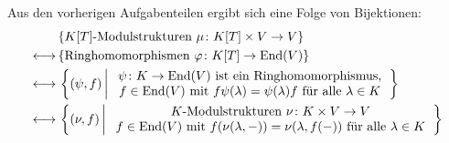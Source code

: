 \documentclass[a4paper, 10pt, numbers=noenddot]{scrartcl}
\begin{document}
Aus den vorherigen Aufgabenteilen ergibt sich eine Folge von Bijektionen:
\begin{align*}
  &\,
  \{
    \text{$K[T]$-Modulstrukturen $\mu \colon K[T] \times V \to V$}
  \}
  \\
  \longleftrightarrow&\,
  \{
    \text{Ringhomomorphismen $\varphi \colon K[T] \to \End(V)$}
  \}
  \\
  \longleftrightarrow&\,
  \left\{
    (\psi, f)
  \,
  \middle|
  \,
    \begin{tabular}{c}
      $\psi \colon K \to \End(V)$ ist ein Ringhomomorphismus, \\
      $f \in \End(V)$ mit $f \psi(\lambda) = \psi(\lambda) f$ für alle $\lambda \in K$
    \end{tabular}
  \right\}
  \\
  \longleftrightarrow&\,
  \left\{
    (\nu, f)
  \,
  \middle|
  \,
    \begin{tabular}{c}
      $K$-Modulstrukturen $\nu \colon K \times V \to V$\\
      $f \in \End(V)$ mit $f(\nu(\lambda, -)) = \nu(\lambda, f(-))$ für alle $\lambda \in K$
    \end{tabular}
  \right\}
\end{align*}
\end{document}
